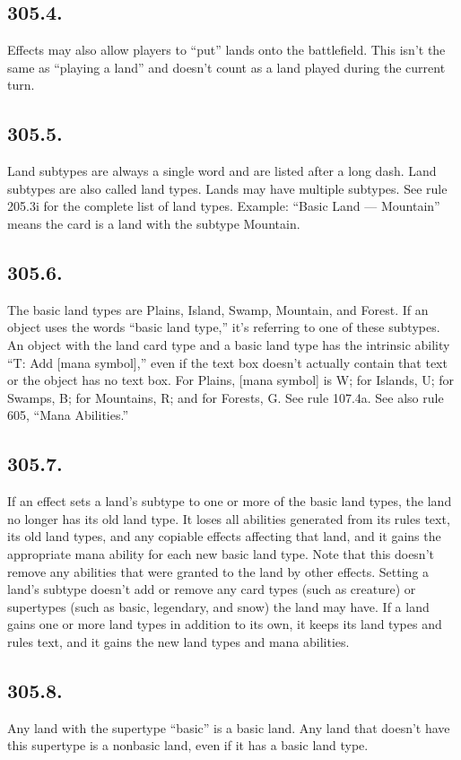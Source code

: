 \subsection*{305.4.}
Effects may also allow players to “put” lands onto the battlefield. This isn’t the same as “playing a land” and doesn’t count as a land played during the current turn.

\subsection*{305.5.}
Land subtypes are always a single word and are listed after a long dash. Land subtypes are also called land types. Lands may have multiple subtypes. See rule 205.3i for the complete list of land types.
Example: “Basic Land — Mountain” means the card is a land with the subtype Mountain.

\subsection*{305.6.}
The basic land types are Plains, Island, Swamp, Mountain, and Forest. If an object uses the words “basic land type,” it’s referring to one of these subtypes. An object with the land card type and a basic land type has the intrinsic ability “{T}: Add [mana symbol],” even if the text box doesn’t actually contain that text or the object has no text box. For Plains, [mana symbol] is {W}; for Islands, {U}; for Swamps, {B}; for Mountains, {R}; and for Forests, {G}. See rule 107.4a. See also rule 605, “Mana Abilities.”

\subsection*{305.7.}
If an effect sets a land’s subtype to one or more of the basic land types, the land no longer has its old land type. It loses all abilities generated from its rules text, its old land types, and any copiable effects affecting that land, and it gains the appropriate mana ability for each new basic land type. Note that this doesn’t remove any abilities that were granted to the land by other effects. Setting a land’s subtype doesn’t add or remove any card types (such as creature) or supertypes (such as basic, legendary, and snow) the land may have. If a land gains one or more land types in addition to its own, it keeps its land types and rules text, and it gains the new land types and mana abilities.

\subsection*{305.8.}
Any land with the supertype “basic” is a basic land. Any land that doesn’t have this supertype is a nonbasic land, even if it has a basic land type.

